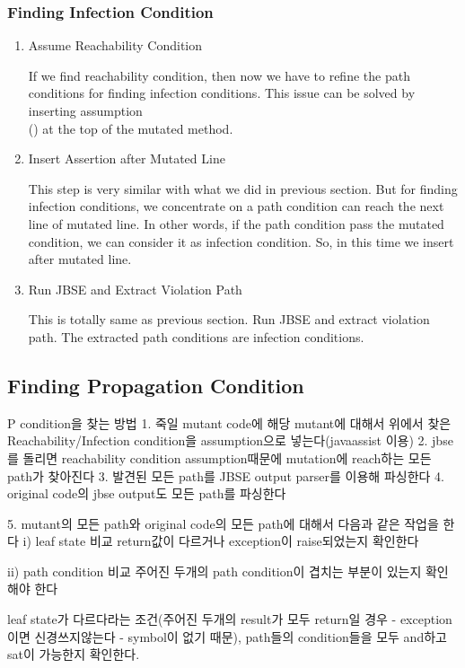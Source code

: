 \documentclass{article}
\begin{document}
\subsubsection{Finding Infection Condition}
\begin{enumerate}
    \item Assume Reachability Condition
    
    If we find reachability condition, then now we have to refine the path conditions for finding infection conditions. This issue can be solved by inserting assumption \\
    () at the top of the mutated method.
    \item Insert Assertion after Mutated Line
    
    This step is very similar with what we did in previous section. But for finding infection conditions, we concentrate on a path condition can reach the next line of mutated line. In other words, if the path condition pass the mutated condition, we can consider it as infection condition. So, in this time we insert  after mutated line.
    \item Run JBSE and Extract Violation Path
    
    This is totally same as previous section. Run JBSE and extract violation path. The extracted path conditions are infection conditions.
\end{enumerate}


\subsection{Finding Propagation Condition}

\iffalse

P condition을 찾는 방법
1. 죽일 mutant code에 해당 mutant에 대해서 위에서 찾은 Reachability/Infection condition을 assumption으로 넣는다(javaassist 이용)
2. jbse를 돌리면 reachability condition assumption때문에 mutation에 reach하는 모든 path가 찾아진다
3. 발견된 모든 path를 JBSE output parser를 이용해 파싱한다
4. original code의 jbse output도 모든 path를 파싱한다

5. mutant의 모든 path와 original code의 모든 path에 대해서 다음과 같은 작업을 한다
 i) leaf state 비교
    return값이 다르거나 exception이 raise되었는지 확인한다
    
 ii) path condition 비교
    주어진 두개의 path condition이 겹치는 부분이 있는지 확인해야 한다

  leaf state가 다르다라는 조건(주어진 두개의 result가 모두 return일 경우 - exception이면 신경쓰지않는다 - symbol이 없기 때문), path들의 condition들을 모두 and하고 sat이 가능한지 확인한다.
\end{document}
